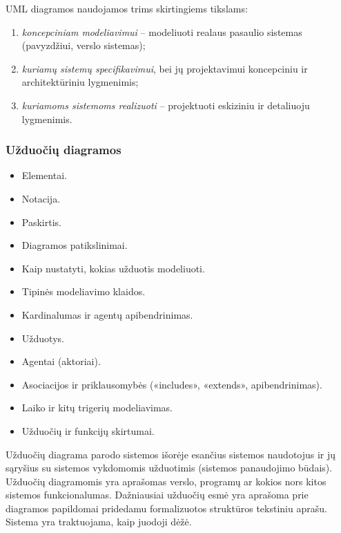 UML diagramos naudojamos trims skirtingiems tikslams:
\begin{enumerate}
  \item \emph{koncepciniam modeliavimui} – modeliuoti realaus pasaulio
    sistemas (pavyzdžiui, verslo sistemas);
  \item \emph{kuriamų sistemų specifikavimui}, bei jų projektavimui
    koncepciniu ir architektūriniu lygmenimis;
  \item \emph{kuriamoms sistemoms realizuoti} – projektuoti eskiziniu
    ir detaliuoju lygmenimis.
\end{enumerate}


\subsubsection{Užduočių diagramos}

\begin{itemize}
  \item Elementai.
  \item Notacija.
  \item Paskirtis.
  \item Diagramos patikslinimai.
  \item Kaip nustatyti, kokias užduotis modeliuoti.
  \item Tipinės modeliavimo klaidos.
  \item Kardinalumas ir agentų apibendrinimas.
  \item Užduotys.
  \item Agentai (aktoriai).
  \item Asociacijos ir priklausomybės («includes», «extends», 
    apibendrinimas).
  \item Laiko ir kitų trigerių modeliavimas.
  \item Užduočių ir funkcijų skirtumai.
\end{itemize}


Užduočių  diagrama parodo sistemos išorėje esančius sistemos 
naudotojus
ir jų sąryšius su sistemos vykdomomis užduotimis (sistemos panaudojimo
būdais). Užduočių diagramomis yra aprašomas verslo, programų ar kokios
nors kitos sistemos funkcionalumas. Dažniausiai užduočių esmė yra
aprašoma prie diagramos papildomai pridedamu formalizuotos struktūros
tekstiniu aprašu. Sistema yra traktuojama, kaip juodoji dėžė.

